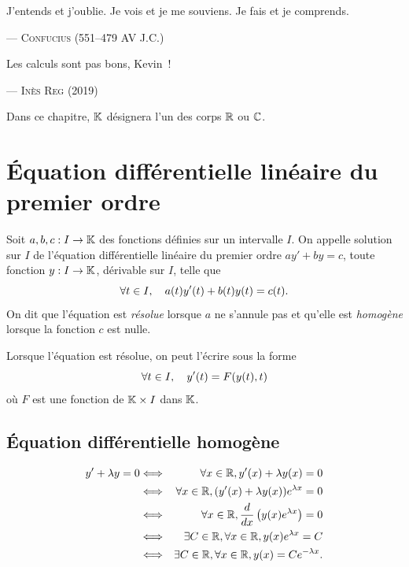 \documentclass{magnolia}
\begin{document}
\setlength{}
\epigraph{\og J'entends et j'oublie. Je vois et je me souviens. Je fais et je comprends.\fg}{--- \textsc{Confucius (551--479 AV J.C.)}}
\setlength{}
\epigraph{\og Les calculs sont pas bons, Kevin~!\fg}{--- \textsc{Inès Reg (2019)}}

\magtoc

\vspace{2ex}
Dans ce chapitre, $\mathbb{K}$ désignera l'un des corps $\mathbb{R}$ ou $\mathbb{C}$.

\section{Équation différentielle linéaire du premier ordre}

\begin{definition}
Soit $a,b,c:I\to\mathbb{K}$ des fonctions définies sur un intervalle $I$. On appelle
solution sur $I$ de l'équation différentielle linéaire du premier ordre $a y'+b y=c$, toute
fonction $y:I\to\mathbb{K}$, dérivable sur $I$, telle que
\[\forall t\in I,\quad a(t)y'(t)+b(t)y(t)=c(t).\]
On dit que l'équation est \emph{résolue} lorsque $a$ ne s'annule pas et qu'elle est
\emph{homogène} lorsque la fonction $c$ est nulle.
\end{definition}

\begin{remarqueUnique}
\remarque Lorsque l'équation est résolue, on peut l'écrire sous la forme
  \[\forall t\in I,\quad y'(t)=F(y(t),t)\]
  où $F$ est une fonction de $\mathbb{K}\times I$ dans $\mathbb{K}$.
\end{remarqueUnique}

\subsection{Équation différentielle homogène}


\begin{sol}
\begin{victor}
\begin{eqnarray*}
y'+\lambda y=0 &\Longleftrightarrow& \forall x \in \mathbb{R}, y'(x)+\lambda y(x)=0 \\
&\Longleftrightarrow& \forall x \in \mathbb{R}, (y'(x)+\lambda y(x))e^{\lambda x}=0 \\
&\Longleftrightarrow& \forall x \in \mathbb{R}, \frac{d}{dx}\left(y(x)e^{\lambda x}\right)=0 \\
&\Longleftrightarrow& \exists C\in \mathbb{R}, \forall x \in \mathbb{R}, y(x)e^{\lambda x}=C \\
&\Longleftrightarrow& \exists C\in \mathbb{R}, \forall x \in \mathbb{R}, y(x)=Ce^{-\lambda x}.
\end{eqnarray*}
\end{victor}
\end{sol}
\end{document}
